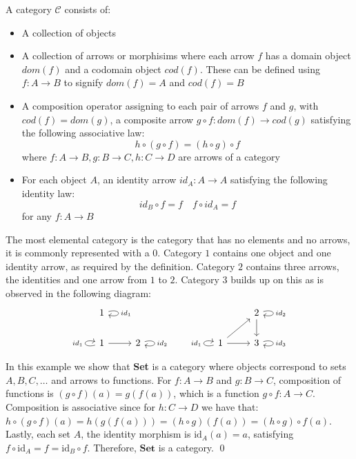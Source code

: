 
\begin{definition} A category $\mathcal{C}$ consists of:
  \begin{itemize}
  \item A collection of objects
  \item A collection of arrows or morphisims where each arrow $f$ has a domain object $dom(f)$ and a codomain object $cod (f)$. These can be defined using $f : A \to B $ to signify $dom(f) = A$ and $cod(f) = B$
  \item A composition operator assigning to each pair of arrows $f$ and $g$, with $cod(f) = dom(g)$, a composite arrow $g \circ f : dom(f) \to cod (g)$ satisfying the following associative law:
    \[
      h \circ (g \circ f) = (h \circ g) \circ f
    \]
    where $f : A \to B, g : B \to C, h : C \to D$ are arrows of a category
  \item For each object $A$, an identity arrow $id_A : A \to A$ satisfying the following identity law:
    \[
      id_B \circ f = f \quad f \circ id_A = f 
    \]
    for any $f : A \to B$
  \end{itemize}
\end{definition}
\begin{remark}
\end{remark}
\begin{example} The most elemental category is the category that has no elements and no arrows, it is commonly represented with a $0$. Category $1$ contains one object and one identity arrow, as required by the definition. Category $2$ contains three arrows, the identities and one arrow from $1$ to $2$. Category $3$ builds up on this as is observed in the following diagram:
  \[
    \begin{tikzcd}
      1 \arrow[loop right, "id_1"] & & & & & 2 \arrow[d] \arrow[loop right, "id_2"] \\
      1 \arrow[r] \arrow[loop left, "id_1"] & 2 \arrow[loop right, "id_2"] & & &1 \arrow[r] \arrow[ru] \arrow[loop left, "id_1"] & 3 \arrow[loop right, "id_3"]
    \end{tikzcd}
  \]
\end{example}
\begin{example} In this example we show that \textbf{Set} is a category where objects correspond to sets $A,B,C,\dots$ and arrows to functions.
  For $f: A \to B$ and $g: B \to C$, composition of functions is $(g \circ f)(a) = g(f(a))$, which is a function $ g \circ f : A \to C$.
  Composition is associative since for $h: C \to D$ we have that: \( h \circ (g \circ f)(a) = h(g(f(a))) = (h \circ g)(f(a)) = (h \circ g) \circ f(a) \).
  Lastly, each set $A$, the identity morphism is $\mathrm{id}_A(a) = a$, satisfying $f \circ \mathrm{id}_A = f = \mathrm{id}_B \circ f$.
  Therefore, $\mathbf{Set}$ is a category. \qed
\end{example}
